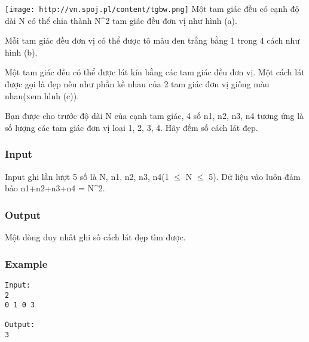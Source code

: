 




\texttt{[image: http://vn.spoj.pl/content/tgbw.png]}   Một tam giác đều có cạnh độ dài N có thể chia thành N^2 tam giác đều đơn vị như hình (a).   


   Mỗi tam giác đều đơn vị có thể được tô màu đen trắng bằng 1 trong 4 cách như hình (b).   


   Một tam giác đều có thể được lát kín bằng các tam giác đều đơn vị. Một cách lát được gọi là đẹp nếu như phần kề nhau của 2 tam giác đơn vị giống màu nhau(xem hình (c)).   


   Bạn được cho trước độ dài N của cạnh tam giác, 4 số n1, n2, n3, n4 tương ứng là số lượng các tam giác đơn vị loại 1, 2, 3, 4. Hãy đếm số cách lát đẹp.  

\subsubsection{   Input  }

   Input ghi lần lượt 5 số là N, n1, n2, n3, n4(1 $\le$ N $\le$ 5). Dữ liệu vào luôn đảm bảo n1+n2+n3+n4 = N^2.  

\subsubsection{   Output  }

   Một dòng duy nhất ghi số cách lát đẹp tìm được.  

\subsubsection{   Example  }
\begin{verbatim}
Input:
2
0 1 0 3

Output:
3
\end{verbatim}

